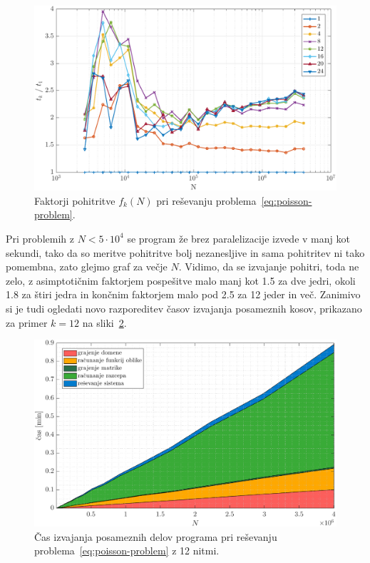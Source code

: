 \documentclass[12pt,a4paper,twoside]{article}
\theoremstyle{definition} %
\theoremstyle{plain} %
\numberwithin{equation}{section}
\newlength{\iw}
\begin{document}
\begin{figure}[!h]
  \centering
  \includegraphics[width=\iw]{images/poisson_square_speedup.pdf}
  \caption[Faktorji pohitritve pri reševanju Poissonove enačbe.]{Faktorji pohitritve $f_k(N)$ pri
  reševanju problema~\eqref{eq:poisson-problem}.}
  \label{fig:poisson-square-speedup}
\end{figure}
Pri problemih z $N < 5\cdot 10^4$ se program že brez paralelizacije izvede v manj kot sekundi, tako
da so meritve pohitritve bolj nezanesljive in sama pohitritev ni tako pomembna, zato glejmo graf za
večje $N$. Vidimo, da se izvajanje pohitri, toda ne zelo, z asimptotičnim faktorjem pospešitve malo manj kot
1.5 za dve jedri, okoli 1.8 za štiri jedra in končnim faktorjem malo pod 2.5 za 12 jeder in več.
Zanimivo si je tudi ogledati novo razporeditev časov izvajanja posameznih kosov, prikazano za primer
$k =12$ na sliki~\ref{fig:poisson-square-time-distribution-12}.

\begin{figure}[h!]
  \centering
  \includegraphics[width=\iw]{images/poisson_square_time_distribution_12.pdf}
  \caption[Čas izvajanja delov programa pri uporabi 12 niti.]{Čas izvajanja posameznih delov programa pri reševanju
  problema~\eqref{eq:poisson-problem} z 12 nitmi.}
  \label{fig:poisson-square-time-distribution-12}
\end{figure}
\end{document}
